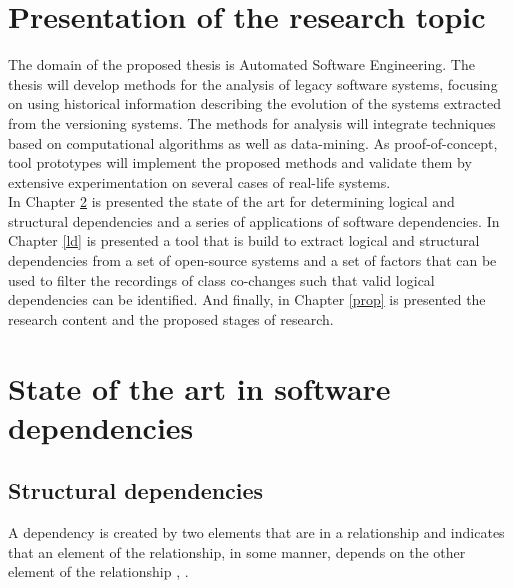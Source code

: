 \documentclass[12pt, a4paper, twoside]{report}
\begin{document}
\vspace*{-4cm}
\pagestyle{empty}
\tableofcontents
\clearpage

\newpage
\vspace*{-4cm}
\listoftables

\newpage
\vspace*{-4cm}
\listoffigures

\pagestyle{fancy}


\newpage
\chapter{Presentation of the research topic}


The domain of the proposed thesis is Automated Software Engineering. The thesis will develop methods for the analysis of legacy software systems, focusing on using historical information describing the evolution of the systems extracted from the versioning systems. 
The methods for analysis will integrate techniques based on computational algorithms as well as data-mining. As proof-of-concept, tool prototypes will implement the proposed methods and validate them by extensive experimentation on several cases of real-life systems.\\

In Chapter \ref{dep} is presented the state of the art for determining logical and structural dependencies and a series of applications of software dependencies. In Chapter \ref{ld} is presented a tool that is build to extract logical and structural dependencies from a set of open-source systems and a set of factors that can be used to filter the recordings of class co-changes such that valid logical dependencies can be identified. And finally, in Chapter \ref{prop} is presented the research content and the proposed stages of research.


\chapter{State of the art in software dependencies}
\label{dep}


\section{Structural dependencies}
A dependency is created by two elements that are in a relationship and indicates that an element of the relationship, in some manner, depends on the other element of the relationship \cite{Booch:2004:OAD:975416}, \cite{Cataldo2009SoftwareDW}.
\end{document}
